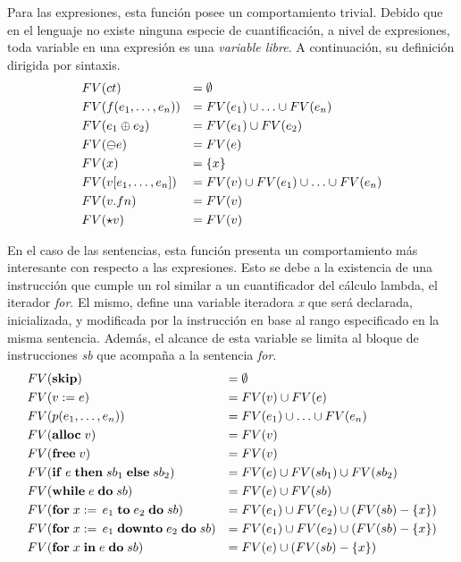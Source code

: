 \documentclass{article}
\begin{document}
Para las expresiones, esta función posee un comportamiento trivial.
Debido que en el lenguaje no existe ninguna especie de cuantificación, a nivel de expresiones, toda variable en una expresión es una \textit{variable libre}.
A continuación, su definición dirigida por sintaxis.
\begin{align*}
&FV(ct)
&=&\;
\emptyset
\\
&FV(f(e_1, \ldots, e_n))
&=&\;
FV(e_1) \cup \ldots \cup FV(e_n)
\\
&FV(e_1 \oplus e_2)
&=&\;
FV(e_1) \cup FV(e_2)
\\
&FV(\ominus e)
&=&\;
FV(e)
\\
&FV(x)
&=&\;
\{ x \}
\\
&FV(v [e_1, \ldots, e_n])
&=&\;
FV(v) \cup FV(e_1) \cup \ldots \cup FV(e_n)
\\
&FV(v.fn)
&=&\;
FV(v)
\\
&FV(\star v)
&=&\;
FV(v)
\end{align*}

En el caso de las sentencias, esta función presenta un comportamiento más interesante con respecto a las expresiones.
Esto se debe a la existencia de una instrucción que cumple un rol similar a un cuantificador del cálculo lambda, el iterador \textit{for}.
El mismo, define una variable iteradora \textit{x} que será declarada, inicializada, y modificada por la instrucción en base al rango especificado en la misma sentencia.
Además, el alcance de esta variable se limita al bloque de instrucciones \textit{sb} que acompaña a la sentencia \textit{for}.
\begin{align*}
&FV(\mathbf{skip})
&=&\;
\emptyset
\\
&FV(v := e)
&=&\;
FV(v) \cup FV(e)
\\
&FV(p(e_1, \ldots, e_n))
&=&\;
FV(e_1) \cup \ldots \cup FV(e_n)
\\
&FV(\mathbf{alloc} \; v)
&=&\;
FV(v)
\\
&FV(\mathbf{free} \; v)
&=&\;
FV(v)
\\
&FV(\mathbf{if} \; e \; \mathbf{then} \; sb_1 \; \mathbf{else} \; sb_2)
&=&\;
FV(e) \cup FV(sb_1) \cup FV(sb_2)
\\
&FV(\mathbf{while} \; e \; \mathbf{do} \; sb)
&=&\;
FV(e) \cup FV(sb)
\\
&FV(\mathbf{for} \; x := \, e_1 \; \mathbf{to} \; e_2 \; \mathbf{do} \; sb)
&=&\;
FV(e_1) \cup FV(e_2) \cup (FV(sb) - \{ x \})
\\
&FV(\mathbf{for} \; x := \, e_1 \; \mathbf{downto} \; e_2 \; \mathbf{do} \; sb)
&=&\;
FV(e_1) \cup FV(e_2) \cup (FV(sb) - \{ x \})
\\
&FV(\mathbf{for} \; x \; \mathbf{in} \; e \; \mathbf{do} \; sb)
&=&\;
FV(e) \cup (FV(sb) - \{ x \})
\end{align*}
\end{document}
